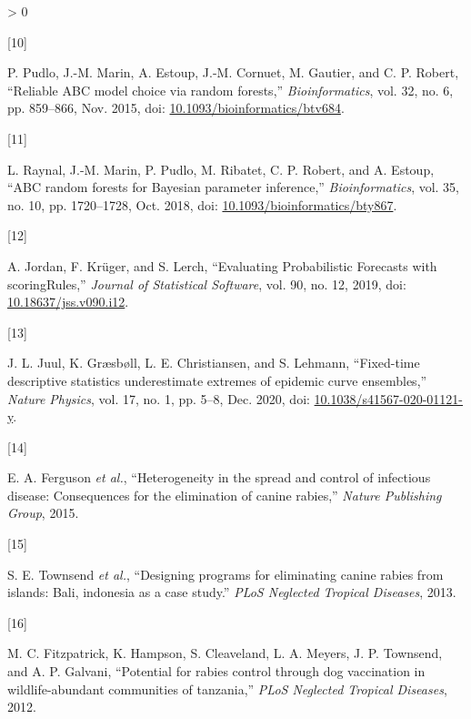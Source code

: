 \documentclass[
]{book}
\newlength{\cslhangindent}
\newlength{\csllabelwidth}
\newenvironment{CSLReferences}[2] %
 {%
  \setlength{\parindent}{0pt}
  \ifodd #1 \everypar{\setlength{\hangindent}{\cslhangindent}}\ignorespaces\fi
  \ifnum #2 > 0
  \setlength{\parskip}{#2\baselineskip}
  \fi
 }%
 {}
\newcommand{\CSLLeftMargin}[1]{\parbox[t]{\csllabelwidth}{#1}}
\newcommand{\CSLRightInline}[1]{\parbox[t]{\linewidth - \csllabelwidth}{#1}\break}
\begin{document}
\begin{CSLReferences}{0}{0}
\leavevmode\hypertarget{ref-pudlo2015}{}%
\CSLLeftMargin{{[}10{]} }
\CSLRightInline{P. Pudlo, J.-M. Marin, A. Estoup, J.-M. Cornuet, M. Gautier, and C. P. Robert, {``Reliable ABC model choice via random forests,''} \emph{Bioinformatics}, vol. 32, no. 6, pp. 859--866, Nov. 2015, doi: \href{https://doi.org/10.1093/bioinformatics/btv684}{10.1093/bioinformatics/btv684}.}

\leavevmode\hypertarget{ref-raynal2018}{}%
\CSLLeftMargin{{[}11{]} }
\CSLRightInline{L. Raynal, J.-M. Marin, P. Pudlo, M. Ribatet, C. P. Robert, and A. Estoup, {``ABC random forests for Bayesian parameter inference,''} \emph{Bioinformatics}, vol. 35, no. 10, pp. 1720--1728, Oct. 2018, doi: \href{https://doi.org/10.1093/bioinformatics/bty867}{10.1093/bioinformatics/bty867}.}

\leavevmode\hypertarget{ref-jordan2019}{}%
\CSLLeftMargin{{[}12{]} }
\CSLRightInline{A. Jordan, F. Krüger, and S. Lerch, {``Evaluating Probabilistic Forecasts with scoringRules,''} \emph{Journal of Statistical Software}, vol. 90, no. 12, 2019, doi: \href{https://doi.org/10.18637/jss.v090.i12}{10.18637/jss.v090.i12}.}

\leavevmode\hypertarget{ref-juul2020}{}%
\CSLLeftMargin{{[}13{]} }
\CSLRightInline{J. L. Juul, K. Græsbøll, L. E. Christiansen, and S. Lehmann, {``Fixed-time descriptive statistics underestimate extremes of epidemic curve ensembles,''} \emph{Nature Physics}, vol. 17, no. 1, pp. 5--8, Dec. 2020, doi: \href{https://doi.org/10.1038/s41567-020-01121-y}{10.1038/s41567-020-01121-y}.}

\leavevmode\hypertarget{ref-ferguson2015}{}%
\CSLLeftMargin{{[}14{]} }
\CSLRightInline{E. A. Ferguson \emph{et al.}, {``Heterogeneity in the spread and control of infectious disease: Consequences for the elimination of canine rabies,''} \emph{Nature Publishing Group}, 2015.}

\leavevmode\hypertarget{ref-townsend2013}{}%
\CSLLeftMargin{{[}15{]} }
\CSLRightInline{S. E. Townsend \emph{et al.}, {``Designing programs for eliminating canine rabies from islands: Bali, indonesia as a case study.''} \emph{PLoS Neglected Tropical Diseases}, 2013.}

\leavevmode\hypertarget{ref-fitzpatrick2012}{}%
\CSLLeftMargin{{[}16{]} }
\CSLRightInline{M. C. Fitzpatrick, K. Hampson, S. Cleaveland, L. A. Meyers, J. P. Townsend, and A. P. Galvani, {``Potential for rabies control through dog vaccination in wildlife-abundant communities of tanzania,''} \emph{PLoS Neglected Tropical Diseases}, 2012.}


\end{CSLReferences}
\end{document}
